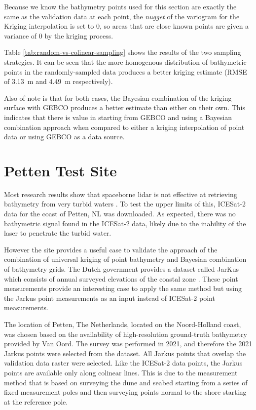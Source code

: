 Because we know the bathymetry points used for this section are exactly the same as the validation data at each point, the \emph{nugget} of the variogram for the Kriging interpolation is set to $0$, so areas that are close known points are given a variance of $0$ by the kriging process.


Table \ref{tab:random-vs-colinear-sampling} shows the results of the two sampling strategies. It can be seen that the more homogenous distribution of bathymetric points in the randomly-sampled data produces a better kriging estimate (RMSE of 3.13~m and 4.49~m respectively).

Also of note is that for both cases, the Bayesian combination of the kriging surface with GEBCO produces a better estimate than either on their own. This indicates that there is value in starting from GEBCO and using a Bayesian combination approach when compared to either a kriging interpolation of point data or using GEBCO as a data source.


\section{Petten Test Site}\label{subsec:petten_kriging}
Most research results show that spaceborne lidar is not effective at retrieving bathymetry from very turbid waters \parencite{Daly2022,Coveney2021a}. To test the upper limits of this, ICESat-2 data for the coast of Petten, NL was downloaded. As expected, there was no bathymetric signal found in the ICESat-2 data, likely due to the inability of the laser to penetrate the turbid water.

However the site provides a useful case to validate the approach of the combination of universal kriging of point bathymetry and Bayesian combination of bathymetry grids. The Dutch government provides a dataset called JarKus which consists of annual surveyed elevations of the coastal zone \parencite{Minneboo1995}. These point measurements provide an interesting case to apply the same method but using the Jarkus point measurements as an input instead of ICESat-2 point measurements.

The location of Petten, The Netherlands, located on the Noord-Holland coast, was chosen based on the availability of high-resolution ground-truth bathymetry provided by Van Oord. The survey was performed in 2021, and therefore the 2021 Jarkus points were selected from the dataset. All Jarkus points that overlap the validation data raster were selected. Like the ICESat-2 data points, the Jarkus points are available only along colinear lines. This is due to the measurement method that is based on surveying the dune and seabed starting from a series of fixed measurement poles and then surveying points normal to the shore starting at the reference pole.

